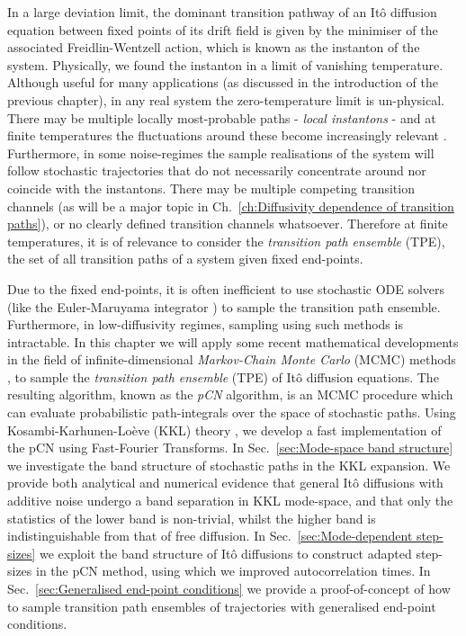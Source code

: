 In a large deviation limit, the dominant transition pathway of an Itô diffusion equation between fixed points of its drift field is given by the minimiser of the associated Freidlin-Wentzell action, which is known as the instanton of the system. Physically, we found the instanton in a limit of vanishing temperature. Although useful for many applications (as discussed in the introduction of the previous chapter), in any real system the zero-temperature limit is un-physical. There may be multiple locally most-probable paths - \textit{local instantons} - and at finite temperatures the fluctuations around these become increasingly relevant \citep{gelfandIntegrationFunctionalSpaces1960, nickelsenNoiseCorrectionLarge2022, corazzaNormalizedGaussianPath2020b, luGaussianApproximationsTransition2017a}. Furthermore, in some noise-regimes the sample realisations of the system will follow stochastic trajectories that do not necessarily concentrate around nor coincide with the instantons. There may be multiple competing transition channels (as will be a major topic in Ch.~\ref{ch:Diffusivity dependence of transition paths}), or no clearly defined transition channels whatsoever. Therefore at finite temperatures, it is of relevance to consider the \textit{transition path ensemble} (TPE), the set of all transition paths of a system given fixed end-points.

Due to the fixed end-points, it is often inefficient to use stochastic ODE solvers (like the Euler-Maruyama integrator \citep{kloedenNumericalSolutionStochastic2011}) to sample the transition path ensemble. Furthermore, in low-diffusivity regimes, sampling using such methods is intractable. In this chapter we will apply some recent mathematical developments in the field of infinite-dimensional \textit{Markov-Chain Monte Carlo} (MCMC) methods \citep{cotterMCMCMethodsFunctions2013, beskosMCMCMETHODSDIFFUSION2008, hairerAnalysisSPDEsArising2005, hairerAnalysisSPDEsArising2007, hairerSpectralGapsMetropolis2014}, to sample the \textit{transition path ensemble} (TPE) of Itô diffusion equations. The resulting algorithm, known as the \textit{pCN} algorithm, is an MCMC procedure which can evaluate probabilistic path-integrals over the space of stochastic paths. Using Kosambi-Karhunen-Lo\`eve (KKL) theory \citep{kosambiParallelismPathspaces, karhunenUeberLineareMethoden1947, loeveProbabilityTheory1977}, we develop a fast implementation of the pCN using Fast-Fourier Transforms. In Sec.~\ref{sec:Mode-space band structure} we investigate the band structure of stochastic paths in the KKL expansion. We provide both analytical and numerical evidence that general It\^{o} diffusions with additive noise undergo a band separation in KKL mode-space, and that only the statistics of the lower band is non-trivial, whilst the higher band is indistinguishable from that of free diffusion. In Sec.~\ref{sec:Mode-dependent step-sizes} we exploit the band structure of It\^{o} diffusions to construct adapted step-sizes in the pCN method, using which we improved autocorrelation times. In Sec.~\ref{sec:Generalised end-point conditions} we provide a proof-of-concept of how to sample transition path ensembles of trajectories with generalised end-point conditions.

